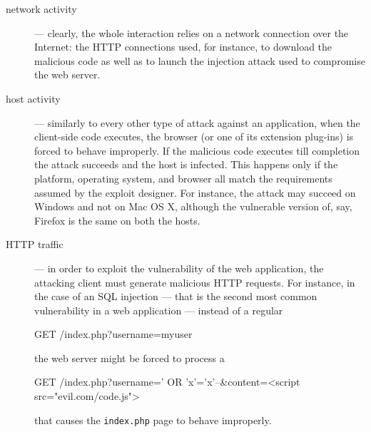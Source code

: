 \begin{description}
\item[network activity] --- clearly, the whole interaction relies on a network connection over the Internet: the \ac{HTTP} connections used, for instance, to download the malicious code as well as to launch the injection attack used to compromise the web server.
\item[host activity] --- similarly to every other type of attack against an application, when the client-side code executes, the browser (or one of its extension plug-ins) is forced to behave improperly. If the malicious code executes till completion the attack succeeds and the host is infected. This happens only if the platform, operating system, and browser all match the requirements assumed by the exploit designer. For instance, the attack may succeed on \textsf{Windows} and not on \textsf{Mac OS X}, although the vulnerable version of, say, \textsf{Firefox} is the same on both the hosts.
\item[HTTP traffic] --- in order to exploit the vulnerability of the web application, the attacking client must generate malicious \ac{HTTP} requests. For instance, in the case of an \ac{SQL} injection --- that is the second most common vulnerability in a web application --- instead of a regular

\begin{logs}
GET /index.php?username=myuser
\end{logs}
  
\noindent the web server might be forced to process a

\begin{logs}
GET /index.php?username=' OR 'x'='x'--\&content=<script src="evil.com/code.js">
\end{logs}

\noindent that causes the \texttt{index.php} page to behave improperly.
\end{description}


